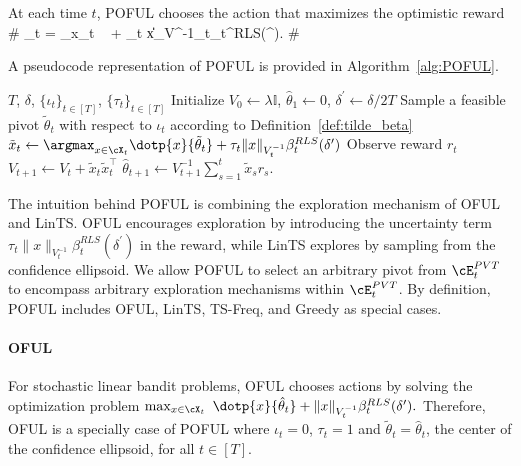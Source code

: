 At each time $t$, POFUL chooses the action that maximizes the optimistic reward \#\label{eq:POFUL}
_t = \argmax_{x\in\cX_t} \    +   \tau_t  \|x\|_{V^{-1}_t}\beta_t^{RLS}(\delta^\prime).
\#

A pseudocode representation of POFUL is provided in Algorithm~\ref{alg:POFUL}.

\begin{algorithm}
	\caption{POFUL }\label{alg:POFUL}
	\begin{algorithmic}
		\REQUIRE $T$, $\delta$,  $\{\iota_t\}_{t\in [T]}$, $\{\tau_t\}_{t\in [T]}$
		\STATE Initialize $ V_{0} \leftarrow \lambda \mathbb{I}$, $\widehat{\theta}_{1} \leftarrow 0$,  $\delta^\prime \leftarrow \delta/2T$
		\STATE Sample a feasible pivot $\tilde{\theta}_{t} $ with respect to  $\iota_t$ according to Definition~\ref{def:tilde_beta}
		\STATE $\tilde{x}_{t} \leftarrow \argmax_{x\in\cX_t} \dotp{x}{\tilde{\theta}_{t}}  +   \tau_t  \|x\|_{V^{-1}_t}\beta_t^{RLS}(\delta^\prime)$
		\STATE Observe reward $r_{t}$
		\STATE $V_{t+1} \leftarrow V_{t}+\tilde{x}_{t}  \tilde{x}_{t}^{\top}$
		\STATE $\hat{\theta}_{t+1} \leftarrow V_{t+1}^{-1}\sum_{s=1}^{t} \tilde{x}_s r_{s}$.
		\ENDFOR
	\end{algorithmic}
\end{algorithm}






The intuition behind POFUL is combining the exploration mechanism of OFUL and LinTS. OFUL encourages exploration by introducing the uncertainty term $\tau_t  \|x\|_{V^{-1}_t}\beta_t^{RLS}(\delta^\prime)$ in the reward, while LinTS explores by sampling from the confidence ellipsoid. We allow POFUL to select an arbitrary pivot from $\cE_t^{\PVT}$ to encompass arbitrary exploration mechanisms within $\cE_t^{\PVT}$.  By definition, POFUL includes OFUL, LinTS, TS-Freq, and Greedy as special cases. 
\paragraph{OFUL} 
For stochastic linear bandit problems, OFUL chooses actions by solving the optimization problem 
	$
	\max_{x\in\cX_t}  \   \dotp{x}{ \hat{\theta}_t}  + \|x\|_{V_t^{-1}}   \beta^{RLS}_t(\delta^\prime).
	$
Therefore, OFUL is a specially case of POFUL where $\iota_t = 0$, $\tau_t = 1$ and $
\tilde{\theta}_t = \hat{\theta}_t$, the center of the confidence ellipsoid, for all $t\in[T]$.

